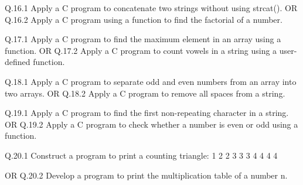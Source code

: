 Q.16.1 Apply a C program to concatenate two strings without using strcat().
OR
Q.16.2 Apply a C program using a function to find the factorial of a number. 

Q.17.1 Apply a C program to find the maximum element in an array using a function.
OR
Q.17.2 Apply a C program to count vowels in a string using a user-defined function. 

Q.18.1 Apply a C program to separate odd and even numbers from an array into two arrays. 
OR
Q.18.2 Apply a C program to remove all spaces from a string.

Q.19.1 Apply a C program to find the first non-repeating character in a string. 
OR
Q.19.2 Apply a C program to check whether a number is even or odd using a function. 

Q.20.1 Construct a program to print a counting triangle:
1
2 2
3 3 3
4 4 4 4

OR
Q.20.2 Develop a program to print the multiplication table of a number n. 


